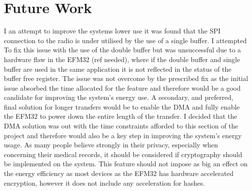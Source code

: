 %
%

\section{Future Work}
I an attempt to improve the systems lower use it was found that the SPI connection to the radio is
under utilised by the use of a single buffer. I attempted To fix this issue with the use of the double
buffer but was unsuccessful due to a hardware flaw in the EFM32 (ref needed), where if the double
buffer and single buffer are used in the same application it is not reflected in the status of the buffer
free register. The issue was not overcome by the prescribed fix as the initial issue absorbed the time
allocated for the feature and therefore would be a good candidate for improving the system's
energy use. A secondary, and preferred, final solution for longer transfers would be to enable the
DMA and fully enable the EFM32 to power down the entire length of the transfer. I decided that the
DMA solution was out with the time constraints afforded to this section of the project and therefore
would also be a key step in improving the system's energy usage.
As many people believe strongly in their privacy, especially when concerning their medical records, it
should be considered if cryptography should be implemented on the system. This feature should not
impose as big an effect on the energy efficiency as most devices as the EFM32 has hardware
accelerated encryption, however it does not include any acceleration for hashes.


